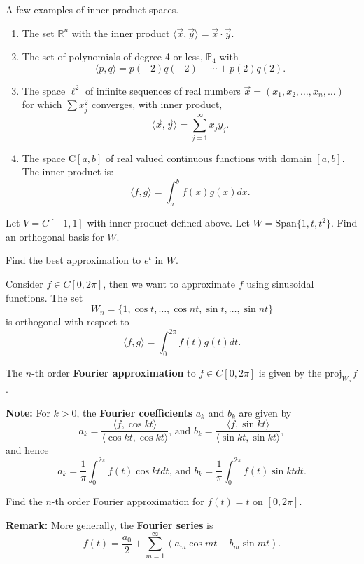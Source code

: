 \documentclass[12pt,letterpaper]{article}
\begin{document}
\begin{enumerate}

 \Problem A few examples of inner product spaces.
\begin{enumerate}
	
	\item The set $\mathbb{R}^n$ with the inner product $\langle \vec{x}, \vec{y}\rangle =\vec{x} \cdot \vec{y}$.
	
	\item The set of polynomials of degree 4 or less, $\mathbb{P}_4$ with $$\langle p, q \rangle = p(-2)q(-2)+\cdots + p(2)q(2).$$
	
	\item The space $\ell^2$ of infinite sequences of real numbers $\vec{x}=(x_{1},x_{2},\ldots,x_{n},\ldots)$ for which $\sum x_j^2 $ converges, with inner product,
	$$\langle \vec{x},\vec{y}\rangle  = \sum_{j=1}^{\infty}x_j y_j.$$
	
	\item The space $\mathrm{C}[a,b]$ of real valued continuous functions with domain $[a,b]$.	The inner product is:	
	$$\langle f,g\rangle  = \int_{a}^b f(x)g(x) dx.$$
	
\end{enumerate}

\newpage

\Problem Let $V=C[-1,1]$ with inner product defined above. Let $W=\text{Span}\{1, t, t^2\}$.
\Part Find an orthogonal basis for $W$.
  
  \vfill
  
\Part Find the best approximation to $e^t$ in $W$.

\vfill

\newpage

Consider $f\in C[0, 2 \pi]$, then we want to approximate $f$ using sinusoidal functions. The set $$W_n=\{1, \cos{t}, \dots, \cos{nt}, \sin{t}, \dots, \sin{nt}\}$$ is orthogonal with respect to $$\langle f,g \rangle = \int_0^{2\pi} f(t) g(t) dt.$$

\begin{defn} The $n$-th order {\bf Fourier approximation} to $f\in C[0,2\pi]$ is given by the $\text{proj}_{W_n}{f}$.
\end{defn}

{\bf Note:}   For $k>0$, the {\bf Fourier coefficients} $a_k$ and $b_k$ are given by $$a_k=\frac{\langle f, \cos{kt} \rangle}{\langle \cos{kt}, \cos{kt}\rangle} \text{, and } b_k=\frac{\langle f, \sin{kt} \rangle}{\langle \sin{kt}, \sin{kt}\rangle},$$ and hence $$a_k=\frac{1}{\pi}\int_0^{2\pi}{f(t)\cos{kt}dt } \text{, and } b_k=\frac{1}{\pi}\int_{0}^{2\pi}{f(t)\sin{kt}dt}.$$



\Problem Find the $n$-th order Fourier approximation for $f(t)=t$ on $[0,2\pi]$.

\vfill

{\bf Remark:} More generally, the {\bf Fourier series} is $$f(t)=\frac{a_0}{2}+\sum_{m=1}^{\infty}{(a_m \cos{mt}+b_m \sin{mt})}.$$

\newpage

\end{enumerate}
\end{document}
